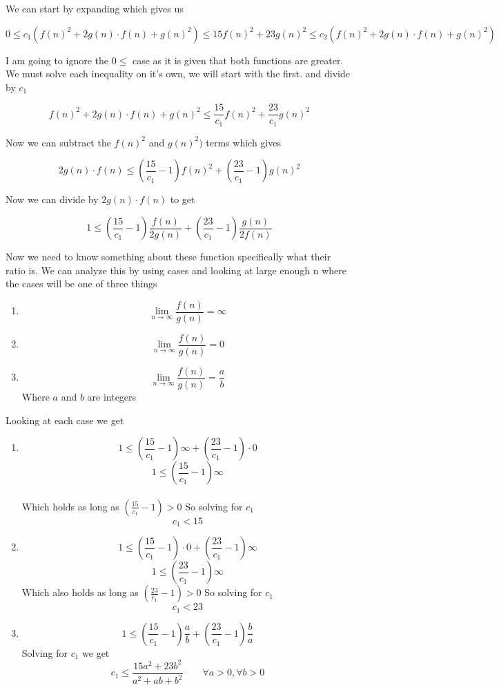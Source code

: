 \documentclass{article}
\begin{document}
We can start by expanding which gives us

$$0 \leq c_{1}(f(n)^2+2g(n) \cdot f(n) + g(n)^2) \leq 15f(n)^2+23g(n)^2 \leq c_{2}(f(n)^2+2g(n) \cdot f(n) + g(n)^2)$$

I am going to ignore the $0 \leq $ case as it is given that both functions are greater.
We must solve each inequality on it's own, we will start with the first. and divide by $c_{1}$

$$f(n)^2+2g(n) \cdot f(n) + g(n)^2 \leq \frac{15}{c_{1}}f(n)^2+\frac{23}{c_{1}}g(n)^2$$

Now we can subtract the $f(n)^2$ and $g(n)^2)$ terms which gives

$$2g(n) \cdot f(n) \leq (\frac{15}{c_{1}}-1)f(n)^2+(\frac{23}{c_{1}}-1)g(n)^2$$

Now we can divide by $2g(n) \cdot f(n)$ to get

$$1 \leq (\frac{15}{c_{1}}-1)\frac{f(n)}{2g(n)}+(\frac{23}{c_{1}}-1)\frac{g(n)}{2f(n)}$$

Now we need to know something about these function specifically what their ratio is.
We can analyze this by using cases and looking at large enough n where the cases will be one of three things

\begin{enumerate}

\item $$\lim_{n \to \infty} \frac{f(n)}{g(n)} = \infty$$
\item $$\lim_{n \to \infty} \frac{f(n)}{g(n)} = 0$$
\item $$\lim_{n \to \infty} \frac{f(n)}{g(n)} = \frac{a}{b}$$ Where $a$ and $b$ are integers

\end{enumerate}

Looking at each case we get

\begin{enumerate}

\item $$1 \leq (\frac{15}{c_{1}}-1) \infty + (\frac{23}{c_{1}}-1)\cdot 0$$
$$1 \leq (\frac{15}{c_{1}}-1) \infty$$ \\
Which holds as long as $(\frac{15}{c_{1}}-1) > 0$ So solving for $c_{1}$
$$c_{1} < 15$$

\item $$1 \leq (\frac{15}{c_{1}}-1)\cdot 0  + (\frac{23}{c_{1}}-1)\infty$$
$$1 \leq (\frac{23}{c_{1}}-1)\infty$$
Which also holds as long as $(\frac{23}{c_{1}}-1) > 0$ So solving for $c_{1}$
$$c_{1} <23$$

\item $$1 \leq (\frac{15}{c_{1}}-1)\frac{a}{b}  + (\frac{23}{c_{1}}-1)\frac{b}{a}$$
Solving for $c_{1}$ we get
$$c_{1} \leq \frac{15a^2+23b^2}{a^2+ab+b^2}\qquad \forall a>0, \forall b>0$$

\end{enumerate}
\end{document}

